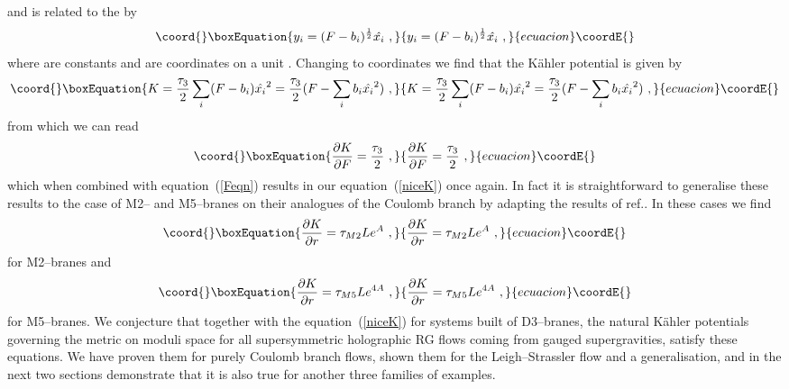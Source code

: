 \documentclass[a4paper,12pt]{article}
\providecommand{\labell}[1]{\label{#1}}
\providecommand{\reef}[1]{(\ref{#1})}
\begin{document}
and is related to the \coordHE{} by
\begin{equation}\coord{}\boxEquation{
  y_i = (F - b_i)^{1 \over 2} \hat{x_i}\ ,
}{
  y_i = (F - b_i)^{1 \over 2} \hat{x_i}\ ,
}{ecuacion}\coordE{}\end{equation}
where \coordHE{} are constants and \coordHE{} are coordinates on a unit
\coordHE{}. Changing to \coordHE{} coordinates we find that the K\"ahler potential
is given by
\begin{equation}\coord{}\boxEquation{
K = {\tau_3 \over 2} \sum_i (F-b_i) \hat{x_i}^2 = {\tau_3 \over 2}(F - \sum_i b_i \hat{x_i}^2)\ ,
}{
K = {\tau_3 \over 2} \sum_i (F-b_i) \hat{x_i}^2 = {\tau_3 \over 2}(F - \sum_i b_i \hat{x_i}^2)\ ,
}{ecuacion}\coordE{}\end{equation}
from which we can read 
\begin{equation}\coord{}\boxEquation{
  {\partial K \over \partial F} = {\tau_3 \over 2} \ , 
}{
  {\partial K \over \partial F} = {\tau_3 \over 2} \ , 
}{ecuacion}\coordE{}\end{equation}
which when combined with equation~(\ref{Feqn}) results in our
equation~(\ref{niceK}) once again.  In fact it is straightforward to
generalise these results to the case of M2-- and M5--branes on their
analogues of the Coulomb branch by adapting the results of
ref.\cite{bakas2}.  In these cases we find
\begin{equation}\coord{}\boxEquation{
 { \partial K \over \partial r} = \tau_{M2} L e^A\ ,
\labell{LPtwo}
}{
 { \partial K \over \partial r} = \tau_{M2} L e^A\ ,
\labell{LPtwo}
}{ecuacion}\coordE{}\end{equation}
for M2--branes and
\begin{equation}\coord{}\boxEquation{
 { \partial K \over \partial r} = \tau_{M5} L e^{4A}\ ,
\labell{LPthree} 
}{
 { \partial K \over \partial r} = \tau_{M5} L e^{4A}\ ,
\labell{LPthree} 
}{ecuacion}\coordE{}\end{equation}
for M5--branes. We conjecture that together with the
equation~\reef{niceK} for systems built of D3--branes, the natural
K\"ahler potentials governing the metric on moduli space for all
supersymmetric holographic RG flows coming from gauged supergravities,
satisfy these equations. We have proven them for purely Coulomb branch
flows, shown them for the Leigh--Strassler flow and a generalisation,
and in the next two sections demonstrate that it is also true for
another three families of examples.
\end{document}
